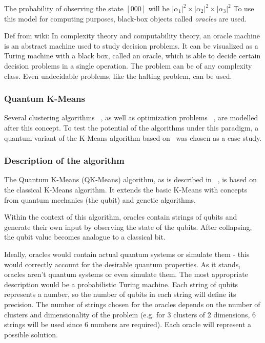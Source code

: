 The probability of observing the state $[000]$ will be $|\alpha_1|^2 \times |\alpha_2|^2 \times |\alpha_3|^2$
To use this model for computing purposes, black-box objects called \emph{oracles} are used.


Def from wiki: In complexity theory and computability theory, an oracle machine is an abstract machine used to study decision problems. It can be visualized as a Turing machine with a black box, called an oracle, which is able to decide certain decision problems in a single operation. The problem can be of any complexity class. Even undecidable problems, like the halting problem, can be used. %




\subsubsection{Quantum K-Means}

Several clustering algorithms ~\cite{Casper2013,Casper,Xiao2010}, as well as optimization problems ~\cite{Wang2013}, are modelled after this concept. To test the potential of the algorithms under this paradigm, a quantum variant of the K-Means algorithm based on~\cite{Casper} was chosen as a case study.

\subsubsection{Description of the algorithm}

The Quantum K-Means (QK-Means) algorithm, as is described in ~\cite{Casper}, is based on the classical K-Means algorithm. It extends the basic K-Means with concepts from quantum mechanics (the qubit) and genetic algorithms.

Within the context of this algorithm, oracles contain strings of qubits and generate their own input by observing the state of the qubits. After collapsing, the qubit value becomes analogue to a classical bit.


Ideally, oracles would contain actual quantum systems or simulate them - this would correctly account for the desirable quantum properties. As it stands, oracles aren't quantum systems or even simulate them. The most appropriate description would be a probabilistic Turing machine.
Each string of qubits represents a number, so the number of qubits in each string will define its precision. The number of strings chosen for the oracles depends on the number of clusters and dimensionality of the problem (e.g. for 3 clusters of 2 dimensions, 6 strings will be used since 6 numbers are required). Each oracle will represent a possible solution.

